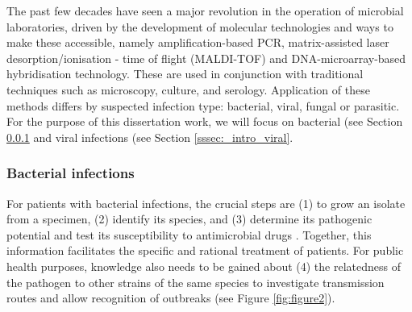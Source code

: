 The past few decades have seen a major revolution in the operation of microbial laboratories, driven by the development of molecular technologies and ways to make these accessible, namely amplification-based \ac{PCR}, matrix-assisted laser desorption/ionisation - time of flight (MALDI-TOF) and \ac{DNA}-microarray-based hybridisation technology. 
These are used in conjunction with traditional techniques such as microscopy, culture, and serology.
Application of these methods differs by suspected infection type: bacterial, viral, fungal or parasitic. 
For the purpose of this dissertation work, we will focus on bacterial (see Section \ref{sssec:_intro_bacterial} and viral infections (see Section \ref{sssec:_intro_viral}.

\subsubsection{Bacterial infections} \label{sssec:_intro_bacterial}

For patients with bacterial infections, the crucial steps are (1) to grow an isolate from a specimen, (2) identify its species, and (3) determine its pathogenic potential and test its susceptibility to antimicrobial drugs  \citep{didelot_transforming_2012}. 
Together, this information facilitates the specific and rational treatment of patients. 
For public health purposes, knowledge also needs to be gained about (4) the relatedness of the pathogen to other strains of the same species to investigate transmission routes and allow recognition of outbreaks \citep{foxman_choosing_2005} (see Figure \ref{fig:figure2}). 

